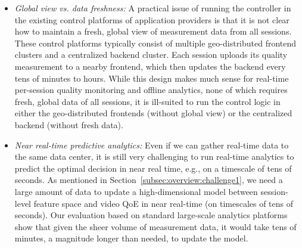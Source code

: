 \begin{itemize}
\item {\em Global view vs. data freshness:} 
A practical issue of running the \ddn controller in the existing control platforms of 
application providers is that it is not clear how to maintain a fresh, global view of
measurement data from all sessions. 
These control platforms  typically consist of multiple geo-distributed frontend clusters 
and a centralized backend cluster. Each  session uploads its quality measurement 
to a nearby frontend, which  then updates the backend every tens of minutes 
to hours. While this design makes much sense for real-time per-session quality 
monitoring and offline analytics, none of which requires fresh, global data of all 
sessions, it is ill-suited to run the \ddn control logic in either the geo-distributed 
frontends (without global view) or the centralized backend (without fresh data).


\item {\em Near real-time predictive analytics:}
Even if we can gather real-time data to the same data center, it is still very 
challenging to run real-time analytics to predict the optimal decision in near 
real time, e.g., on a timescale of tens of seconds.
As mentioned in Section~\ref{subsec:overview:challenge1}, we need a large 
amount of data to update a high-dimensional model between session-level 
feature space and video QoE in near real-time (on timescales of tens of seconds). 
Our evaluation based on standard large-scale analytics platforms show that 
given the sheer volume of measurement data, it would take tens of minutes, 
a magnitude longer than needed, to update the model.

\end{itemize}


